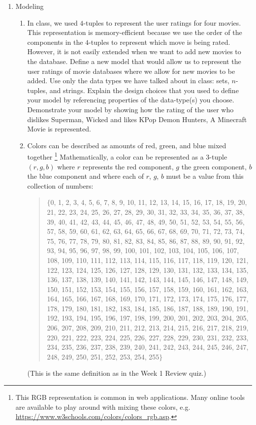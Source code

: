 \begin{enumerate}[labelindent=0pt, leftmargin=0pt]
    \item Modeling
    \begin{enumerate}[labelindent=0pt, leftmargin=0pt]
        \item In class, we used $4$-tuples to represent the user ratings for four movies. 
        This representation is memory-efficient because we use the order of the components in the $4$-tuples to 
        represent which move is being rated. However, it is not easily extended when we want to add new movies to the database.
        Define a new model that would allow us to represent the user ratings of movie databases where we allow for new movies to be added.
        Use only the data types we have talked about in class: sets, $n$-tuples, and strings. Explain the design choices
        that you used to define your model by referencing properties of the data-type(s) you choose.
        Demonstrate your model by showing how the rating of the user who dislikes Superman, Wicked and likes KPop Demon Hunters, A Minecraft Movie is represented.
        
        \item
        Colors can be described as amounts of red, green, and blue mixed together
        \footnote{This RGB representation is common in web applications.  Many online tools are available to play around with mixing these colors,  e.g. \url{https://www.w3schools.com/colors/colors_rgb.asp}. }
        Mathematically, a color can be represented as a $3$-tuple $(r, g, b)$ where $r$ represents the red component, $g$ the green component, $b$ the blue component and where each of $r$, $g$, $b$ must be a value from this collection of numbers:
        \begin{quote}
        $\{$0, 1, 2, 3, 4, 5, 6, 7, 8, 9, 10, 11, 12, 13, 14, 15, 16, 17, 18, 19, 20, 21, 22, 23, 24, 25, 26, 27, 28, 29, 30, 31, 32, 33, 34, 35, 36, 37, 38, 39, 40, 41, 42, 43, 44, 45, 46, 47, 48, 49, 50, 51, 52, 53, 54, 55, 56, 57, 58, 59, 60, 61, 62, 63, 64, 65, 66, 67, 68, 69, 70, 71, 72, 73, 74, 75, 76, 77, 78, 79, 80, 81, 82, 83, 84, 85, 86, 87, 88, 89, 90, 91, 92, 93, 94, 95, 96, 97, 98, 99, 100, 101, 102, 103, 104, 105, 106, 107, 108, 109, 110, 111, 112, 113, 114, 115, 116, 117, 118, 119, 120, 121, 122, 123, 124, 125, 126, 127, 128, 129, 130, 131, 132, 133, 134, 135, 136, 137, 138, 139, 140, 141, 142, 143, 144, 145, 146, 147, 148, 149, 150, 151, 152, 153, 154, 155, 156, 157, 158, 159, 160, 161, 162, 163, 164, 165, 166, 167, 168, 169, 170, 171, 172, 173, 174, 175, 176, 177, 178, 179, 180, 181, 182, 183, 184, 185, 186, 187, 188, 189, 190, 191, 192, 193, 194, 195, 196, 197, 198, 199, 200, 201, 202, 203, 204, 205, 206, 207, 208, 209, 210, 211, 212, 213, 214, 215, 216, 217, 218, 219, 220, 221, 222, 223, 224, 225, 226, 227, 228, 229, 230, 231, 232, 233, 234, 235, 236, 237, 238, 239, 240, 241, 242, 243, 244, 245, 246, 247, 248, 249, 250, 251, 252, 253, 254, 255$\}$
        \end{quote}
        (This is the same definition as in the Week 1 Review quiz.)
        

\end{enumerate}
\end{enumerate}
